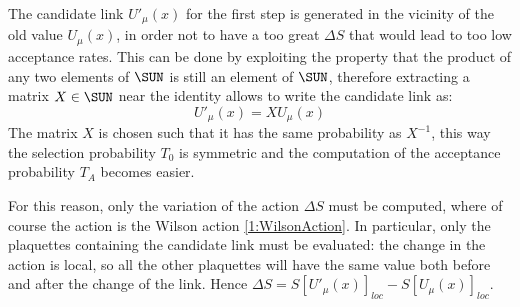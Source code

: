 The candidate link $U'_\mu(x)$ for the first step is generated in the vicinity of the old value $U_\mu(x)$, in order not to have a too great $\Delta S$ that would lead to too low acceptance rates.
This can be done by exploiting the property that the product of any two elements of $\SUN$ is still an element of $\SUN$, therefore extracting a matrix $X\in\SUN$ near the identity allows to write the candidate link as:
\begin{equation}
    U'_\mu(x) = XU_\mu(x) \label{2:MetropolisCandidateLink}
\end{equation}
The matrix $X$ is chosen such that it has the same probability as $X^{-1}$, this way the selection probability $T_0$ is symmetric and the computation of the acceptance probability $T_A$ becomes easier.

For this reason, only the variation of the action $\Delta S$ must be computed, where of course the action is the Wilson action \eqref{1:WilsonAction}.
In particular, only the plaquettes containing the candidate link must be evaluated: the change in the action is local, so all the other plaquettes will have the same value both before and after the change of the link.
Hence $\Delta S = S[U'_\mu(x)]_{loc}-S[U_\mu(x)]_{loc}$.

